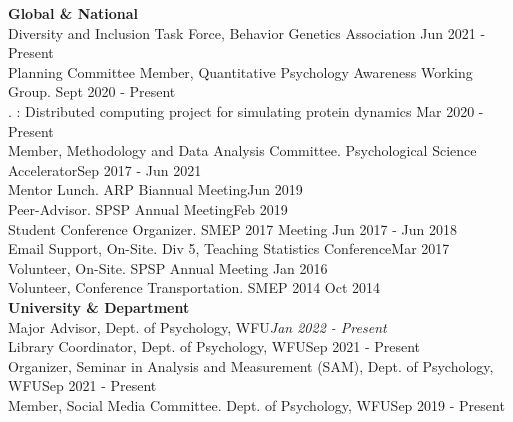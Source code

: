 {\large \textbf{Global \& National}}\smallskip\\
Diversity and Inclusion Task Force, Behavior Genetics Association \hfill{Jun 2021 - Present}\smallskip\\
Planning Committee Member, Quantitative Psychology Awareness Working Group. \hfill{Sept 2020 - Present}\smallskip\\%
. : Distributed computing project for simulating protein dynamics \hfill{Mar 2020 - Present}\smallskip\\
%
Member, Methodology and Data Analysis Committee. Psychological Science Accelerator\hfill{Sep 2017 - Jun 2021}\smallskip\\
%
Mentor Lunch. ARP Biannual Meeting\hfill{Jun 2019}\smallskip\\
Peer-Advisor. SPSP Annual Meeting\hfill{Feb 2019}\smallskip\\
Student Conference Organizer. SMEP 2017 Meeting \hfill{Jun 2017 - Jun 2018}\smallskip\\
Email Support, On-Site. Div 5, Teaching Statistics Conference\hfill{Mar 2017}\smallskip\\
Volunteer, On-Site. SPSP Annual Meeting \hfill{Jan 2016}\smallskip\\
Volunteer, Conference Transportation. SMEP 2014  \hfill{Oct 2014}\medskip\\
%
%
{\large \textbf{University \& Department}}\smallskip\\
Major Advisor, Dept. of Psychology, WFU\hfill {\textit{Jan 2022 - Present}}\smallskip\\
Library Coordinator, Dept. of Psychology, WFU\hfill {Sep 2021 - Present}\smallskip\\
Organizer, Seminar in Analysis and Measurement (SAM), Dept. of Psychology, WFU\hfill {Sep 2021 - Present}\smallskip\\
Member, Social Media Committee. Dept. of Psychology, WFU\hfill {Sep 2019 - Present}\smallskip\\
